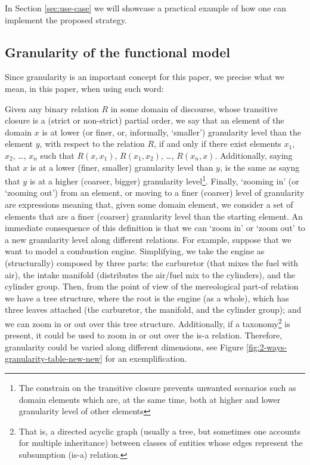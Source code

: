 \documentclass[
]{ceurart}
\begin{document}
In Section \ref{sec:use-case} we will showcase a practical example of how one can implement the proposed strategy.  

\subsection{Granularity of the functional model}

Since granularity is an important concept for this paper, we precise what we mean, in this paper, when using such word:
\bflist
\item[\mydf{granularity}]
    Given any binary relation $R$ in some domain of discourse, whose transitive closure is a (strict or non-strict) partial order, we say that an element of the domain $x$ is at lower (or finer, or, informally, `smaller') granularity level than the element $y$, with respect to the relation $R$, if and only if there exist elements $x_1$, $x_2$, \dots, $x_n$ such that $R(x,x_1)$, $R(x_1,x_2)$, \dots, $R(x_n,x)$. 
    Additionally, saying that $x$ is at a lower (finer, smaller) granularity level than $y$, is the same as sayng that $y$ is at a higher (coarser, bigger) granularity level\footnote{The constrain on the transitive closure prevents unwanted scenarios such as domain elements which are, at the same time, both at higher and lower granularity level of other elements}.
    Finally, `zooming in' (or `zooming out') from an element, or moving to a finer (coarser) level of granularity are expressions meaning that, given some domain element, we consider a set of elements that are a finer (coarser) granularity level than the starting element.
\eflist
An immediate consequence of this definition is that we can `zoom in' or `zoom out' to a new granularity level along different relations. For example, suppose that we want to model a combustion engine. Simplifying, we take the engine as (structurally) composed by three parts: the carburetor (that mixes the fuel with air), the intake manifold (distributes the air/fuel mix to the cylinders), and the cylinder group. Then, from the point of view of the mereological part-of relation we have a tree structure, where the root is the engine (as a whole), which has three leaves attached (the carburetor, the manifold, and the cylinder group); and we can zoom in or out over this tree structure. Additionally, if a taxonomy\footnote{That is, a directed acyclic graph (usually a tree, but sometimes one accounts for multiple inheritance) between classes of entities whose edges represent the subsumption (is-a) relation.} is present, it could be used to zoom in or out over the is-a relation. Therefore, granularity could be varied along different dimensions, see Figure \ref{fig:2-ways-granularity-table-new-new} for an exemplification. 
\end{document}
